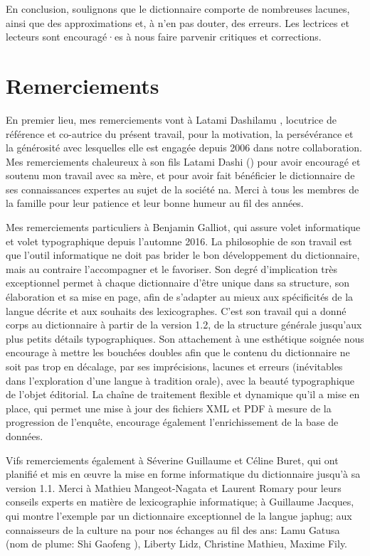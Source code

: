 En conclusion, soulignons que le dictionnaire comporte de nombreuses lacunes, ainsi que des approximations et, à n'en pas douter, des erreurs. Les lectrices et lecteurs sont encouragé·es à nous faire parvenir critiques et corrections.


\section{Remerciements}

En premier lieu, mes remerciements vont à Latami Dashilamu , locutrice de référence et co-autrice du présent travail, pour la motivation, la persévérance et la générosité avec lesquelles elle est engagée depuis 2006 dans notre collaboration. Mes remerciements chaleureux à son fils Latami Dashi  () pour avoir encouragé et soutenu mon travail avec sa mère, et pour avoir fait bénéficier le dictionnaire de ses connaissances expertes au sujet de la société na. Merci à tous les membres de la famille pour leur patience et leur bonne humeur au fil des années.

Mes remerciements particuliers à Benjamin Galliot, qui assure volet informatique et volet typographique depuis l'automne 2016. La philosophie de son travail est que l'outil informatique ne doit pas brider le bon développement du dictionnaire, mais au contraire l'accompagner et le favoriser. Son degré d'implication très exceptionnel permet à chaque dictionnaire d'être unique dans sa structure, son élaboration et sa mise en page, afin de s’adapter au mieux aux spécificités de la langue décrite et aux souhaits des lexicographes. C'est son travail qui a donné corps au dictionnaire à partir de la version 1.2, de la structure générale jusqu'aux plus petits détails typographiques. Son attachement à une esthétique soignée nous encourage à mettre les bouchées doubles afin que le contenu du dictionnaire ne soit pas trop en décalage, par ses imprécisions, lacunes et erreurs (inévitables dans l'exploration d'une langue à tradition orale), avec la beauté typographique de l'objet éditorial. La chaîne de traitement flexible et dynamique qu'il a mise en place, qui permet une mise à jour des fichiers XML et PDF à mesure de la progression de l'enquête, encourage également l’enrichissement de la base de données.

Vifs remerciements également à Séverine Guillaume et Céline Buret, qui ont planifié et mis en œuvre la mise en forme informatique du dictionnaire jusqu'à sa version 1.1. Merci à Mathieu Mangeot-Nagata et Laurent Romary pour leurs conseils experts en matière de lexicographie informatique; à Guillaume Jacques, qui montre l’exemple par un dictionnaire exceptionnel de la langue japhug; aux connaisseurs de la culture na pour nos échanges au fil des ans: Lamu Gatusa  (nom de plume: Shi Gaofeng ), Liberty Lidz, Christine Mathieu, Maxime Fily.

